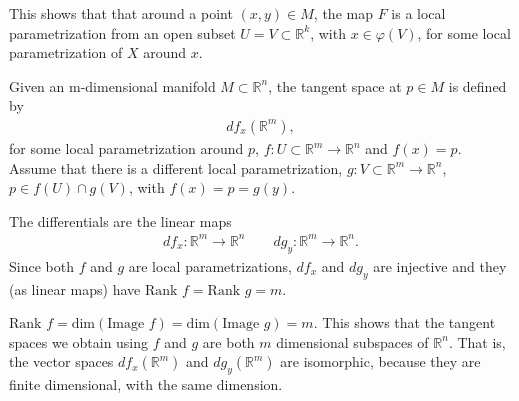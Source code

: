 \begin{solution}[9.1]
This shows that that around a point $(x,y)\in M$, the map $F$ is a local parametrization from an open subset $U=V\subset \mathbb{R}^k$, with $x\in \varphi(V)$, for some local parametrization of $X$ around $x$. 
\end{solution}

\begin{solution}[9.2]
Given an m-dimensional manifold $M\subset \mathbb{R}^n$, the tangent space at $p\in M$ is defined by 
\begin{align}
df_x(\mathbb{R}^m),
\end{align}
for some local parametrization around $p$, $f:U\subset \mathbb{R}^m \to \mathbb{R}^n$ and $f(x)=p$. Assume that there is a different local parametrization, $g: V\subset \mathbb{R}^m \to \mathbb{R}^n$, $p\in f(U) \cap g(V)$, with  $f(x)=p=g(y)$. 

The differentials are the linear maps
\begin{align}
df_x : \mathbb{R}^m \to \mathbb{R}^n \qquad dg_y : \mathbb{R}^m \to \mathbb{R}^n.
\end{align}
Since both $f$ and $g$ are local parametrizations, $df_x$ and $dg_y$ are injective and they (as linear maps) have $\text{Rank } f =\text{Rank } g = m$. 

$\text{Rank } f = \text{dim} (\text{Image }f) = \text{dim} (\text{Image }g) = m$. This shows that the tangent spaces we obtain using $f$ and $g$ are both $m$ dimensional subspaces of $\mathbb{R}^n$. That is, the vector spaces $df_x(\mathbb{R}^m)$ and $dg_y(\mathbb{R}^m)$ are isomorphic, because they are finite dimensional, with the same dimension. 
\end{solution}

